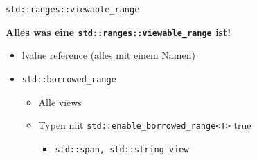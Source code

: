 \begin{frame}{\texttt{std::ranges::viewable_range}}

    \textbf{Alles was eine \texttt{std::ranges::viewable_range} ist!}

    \begin{itemize}
        \item<2-> lvalue reference (alles mit einem Namen)
        \item<3-> \texttt{std::borrowed_range}
            \begin{itemize}
                \item<4-> Alle views
                \item<5-> Typen mit \texttt{std::enable_borrowed_range<T>} true
                    \begin{itemize}
                        \item<6-> \texttt{std::span, std::string_view}
                    \end{itemize}
            \end{itemize}
    \end{itemize}
\end{frame}